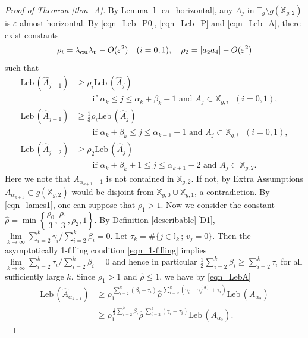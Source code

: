 \documentclass{amsart}
\theoremstyle{plain}
\theoremstyle{definition}
\theoremstyle{remark}
\numberwithin{equation}{section}
\def\xx{\mathbb{X}}
\begin{document}
\begin{proof}[Proof of Theorem \ref{thm_A}]
By Lemma \ref{l_ea_horizontal}, any $A_j$ in $\mathbb{T}_g\setminus g(\xx_{g,2})$ is $\varepsilon$-almost horizontal.
By \eqref{eqn_Leb_P0}, \eqref{eqn_Leb_P} and \eqref{eqn_Leb_A}, there exist constants 
\[
\rho_i=\lambda_{{\rm cs}i}\lambda_{\rm u}-O(\varepsilon^2)\quad (i=0,1),\quad 
\rho_2=|a_2a_4|-O(\varepsilon^2)
\]
such that 
\begin{equation}\label{eqn_LebA}
\begin{split}
\mathrm{Leb}\,(\widehat A_{j+1})&\geq \rho_i\mathrm{Leb}\,(\widehat A_{j})\\
&\qquad\text{if $\alpha_k\leq j\leq \alpha_k+\beta_k-1$ and $A_{j}\subset \mathbb{X}_{g,i}$ $(i=0,1)$},\\
\mathrm{Leb}\,(\widehat A_{j+1})&\geq \frac13\rho_i\mathrm{Leb}\,(\widehat A_{j})\\
&\qquad\text{if $\alpha_k+\beta_k\leq j\leq \alpha_{k+1}-1$ and $A_{j}\subset \mathbb{X}_{g,i}$ $(i=0,1)$},\\
\mathrm{Leb}\,(\widehat A_{j+2})&\geq \rho_2\mathrm{Leb}\,(\widehat A_{j})\\
&\qquad\text{if $\alpha_k+\beta_k+1\leq j\leq \alpha_{k+1}-2$ and $A_{j}\subset \mathbb{X}_{g,2}$.}
\end{split}
\end{equation}
Here we note that $A_{\alpha_{k+1}-1}$ is not contained in $\xx_{g,2}$.
If not, by Extra Assumptions $A_{\alpha_{k+1}}\subset g(\xx_{g,2})$ would be disjoint from $\xx_{g,0}\cup \xx_{g,1}$, a contradiction.
By \eqref{eqn_lamcs1}, one can suppose that $\rho_1>1$.
Now we consider the constant $\widehat\rho=\min\left\{\dfrac{\rho_0}3,\dfrac{\rho_1}3,\rho_2,1\right\}$.
By Definition \ref{describable}\,\eqref{D1}, $\lim\limits_{k\to \infty}\sum_{i=2}^k \gamma_i/\sum_{i=2}^k\beta_i=0$.
Let $\tau_k=\#\{j\in \mathbb{I}_k\,;\,v_j=0\}$.
Then the asymptotically 1-filling condition \eqref{eqn_1-filling} implies $\lim\limits_{k\to \infty}\sum_{i=2}^k \tau_i/\sum_{i=2}^k\beta_i=0$ 
and hence in particular $\frac12\sum_{i=2}^k \beta_i\geq \sum_{i=2}^k\tau_i$ for all sufficiently large $k$.
Since $\rho_1>1$ and $\widehat\rho\leq 1$, we have by \eqref{eqn_LebA} 
\begin{align*}
\mathrm{Leb}\,(\widehat A_{\alpha_{k+1}})&\geq \rho_1^{\,\sum_{i=2}^k(\beta_i-\tau_i)}
\widehat\rho^{\,\sum_{i=2}^k(\gamma_i-\gamma_i^{(3)}+\tau_i)}\mathrm{Leb}\,(A_{\alpha_2})\\
&\geq \rho_1^{\,\frac12\sum_{i=2}^k\beta_i}
\widehat\rho^{\,\sum_{i=2}^k(\gamma_i+\tau_i)}\mathrm{Leb}\,(A_{\alpha_2}).
\end{align*}

\end{proof}
\end{document}
